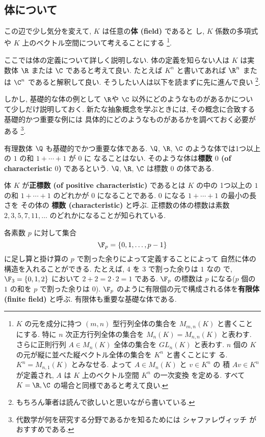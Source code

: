 \documentclass[12pt,twoside]{jarticle}
\begin{document}

\subsection{体について}
\label{sec:field}

\bigskip
{\Large この辺で少し気分を変えて, $K$ は任意の{\bf 体 (field)} であると
  し, $K$ 係数の多項式や $K$ 上のベクトル空間について考えることにする%
  \footnote{
    $K$ の元を成分に持つ $(m,n)$ 型行列全体の集合を $M_{m,n}(K)$ と書くこと
    にする.  特に $n$ 次正方行列全体の集合を $M_n(K)=M_{n,n}(K)$ と表わす.
    さらに正則行列 $A\in M_n(K)$ 全体の集合を $GL_n(K)$ と表わす.
    $n$ 個の $K$ の元が縦に並べた縦ベクトル全体の集合を $K^n$ と書くことにす
    る.  $K^n=M_{n,1}(K)$ とみなせる.  よって $A\in M_n(K)$ と $v\in K^n$ の
    積 $Av\in K^n$ が定義され, $A$ は $K$ 上のベクトル空間 $K^n$ の一次変換
    を定める.  すべて $K=\R,\C$ の場合と同様であると考えて良い.}.}
\bigskip

ここでは体の定義について詳しく説明しない.
体の定義を知らない人は $K$ は実数体 $\R$ または $\C$ であると考えて良い.
たとえば $K^n$ と書いてあれば $\R^n$ または $\C^n$ であると解釈して良い.
そうしたい人は以下を読まずに先に進んで良い%
\footnote{もちろん筆者は読んで欲しいと思いながら書いている.}.

しかし, 基礎的な体の例として $\R$や $\C$ 以外にどのようなものがあるかについ
て少しだけ説明しておく.  新たな抽象概念を学ぶときには, 
その概念に合致する基礎的かつ重要な例には
具体的にどのようなものがあるかを調べておく必要がある%
\footnote{代数学が何を研究する分野であるかを知るためには
  シャファレヴィッチ \cite{shafarevich} がおすすめである.}.

有理数体 $\Q$ も基礎的でかつ重要な体である.  
$\Q$, $\R$, $\C$ のような体では1つ以上の $1$ の和 $1+\cdots+1$ が $0$ に
なることはない.  
そのような体は{\bf 標数 $0$ (of characteristic $0$)} であるという. 
$\Q$, $\R$, $\C$ は標数 $0$ の体である.

体 $K$ が{\bf 正標数 (of positive characteristic)} であるとは $K$ の中の
1つ以上の $1$ の和 $1+\cdots+1$ のどれかが $0$ になることである.
$0$ になる $1+\cdots+1$ の最小の長さを
その体の {\bf 標数 (characteristic)} と呼ぶ.
正標数の体の標数は素数 $2,3,5,7,11,\ldots$ のどれかになることが知られている.

各素数 $p$ に対して集合 
\begin{equation*}
  \F_p=\{0,1,\dots,p-1\}
\end{equation*}
に足し算と掛け算の $p$ で割った余りによって定義することによって
自然に体の構造を入れることができる.  
たとえば, $4$ を $3$ で割った余りは $1$ なの
で, $\F_3=\{0,1,2\}$ において $2+2=2\cdot2=1$ である.
$\F_p$ の標数は $p$ になる($p$ 個の $1$ の和を $p$ で割った余りは $0$).
$\F_p$ のように有限個の元で構成される体を{\bf 有限体 (finite field)} と呼ぶ.
有限体も重要な基礎な体である.
\end{document}
